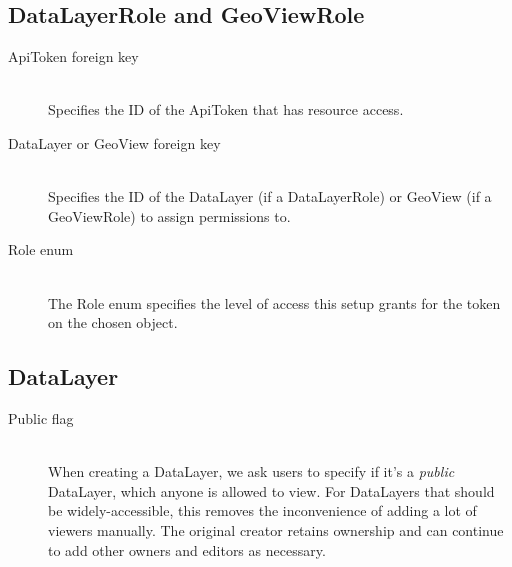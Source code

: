 \subsection{DataLayerRole and GeoViewRole}
\begin{description}
\item[ApiToken foreign key] \hfill \\
Specifies the ID of the ApiToken that has resource access.

\item[DataLayer or GeoView foreign key] \hfill \\
Specifies the ID of the DataLayer (if a DataLayerRole) or GeoView (if a GeoViewRole) to assign permissions to.

\item[Role enum] \hfill \\
The Role enum specifies the level of access this setup grants for the token on the chosen object.
\end{description}


\subsection{DataLayer}
\begin{description}
\item[Public flag] \hfill \\
When creating a DataLayer, we ask users to specify if it's a \textit{public} DataLayer, which anyone is allowed to view. For DataLayers that should be widely-accessible, this removes the inconvenience of adding a lot of viewers manually. The original creator retains ownership and can continue to add other owners and editors as necessary.
\end{description}














\label{design_srid}
